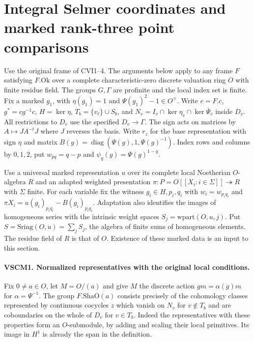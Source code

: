 \section{Integral Selmer coordinates and marked rank-three point comparisons}
\label{sec:countcoord-v62}

Use the original frame of CVI1--4. The arguments below apply to any
frame $F$ satisfying $F.\mathrm{Ok}$ over a complete characteristic-zero
discrete valuation ring $O$ with finite residue field. The groups $G,\Gamma$
are profinite and the local index set is finite. Fix a marked $g_1$,
with $\eta(g_1)=1$ and $\Psi(g_1)^2-1\in O^\times$. Write
$c=F.c$, $g^*=cg^{-1}c$, $H=\ker\eta$, $T_b=\{v_\ell\}\cup S_b$,
and $N_v=I_v\cap\ker\eta_v\cap\ker\overline\Psi_v$ inside $D_v$.
All restrictions to $D_v$ use the specified $D_v\to\Gamma$.
The sign acts on matrices by $A\mapsto JA^{-t}J$ where $J$ reverses
the basis. Write $r_z$ for the base representation with sign $\eta$ and
matrix $B(g)=\operatorname{diag}(\Psi(g),1,\Psi(g)^{-1})$.
Index rows and columns by $0,1,2$, put $w_{pq}=q-p$ and
$\psi_q(g)=\Psi(g)^{1-q}$.

Use a universal marked representation $u$ over its complete local
Noetherian $O$-algebra $R$ and an adapted weighted presentation
$\pi:P=O[[X_i:i\in\Sigma]]\twoheadrightarrow R$ with $\Sigma$ finite.
For each variable fix the witness $g_i\in H,p_i,q_i$ with
$w_i=w_{p_iq_i}$ and
$\pi X_i=u(g_i)_{p_iq_i}-B(g_i)_{p_iq_i}$.
Adaptation also identifies the images of homogeneous series with the
intrinsic weight spaces $S_j=\mathrm{wpart}(O,u,j)$. Put
$S=\mathrm{Sring}(O,u)=\sum_j S_j$, the algebra of finite sums of
homogeneous elements. The residue field of $R$ is that of $O$.
Existence of these marked data is an input to this section.

\paragraph{VSCM1. Normalized representatives with the original local conditions.}
\label{claim:VSCM1}
Fix $0\ne a\in O$, let $M=O/(a)$ and give $M$ the discrete action
$g m=\alpha(g)m$ for $\alpha=\Psi^{-1}$.
The group $F.\mathrm{ShaO}(a)$ consists precisely of the cohomology
classes represented by continuous cocycles $z$ which vanish on $N_v$
for $v\notin T_b$ and are coboundaries on the whole of $D_v$ for
$v\in T_b$. Indeed the representatives with these properties form an
$O$-submodule, by adding and scaling their local primitives. Its image
in $H^1$ is already the span in the definition.

